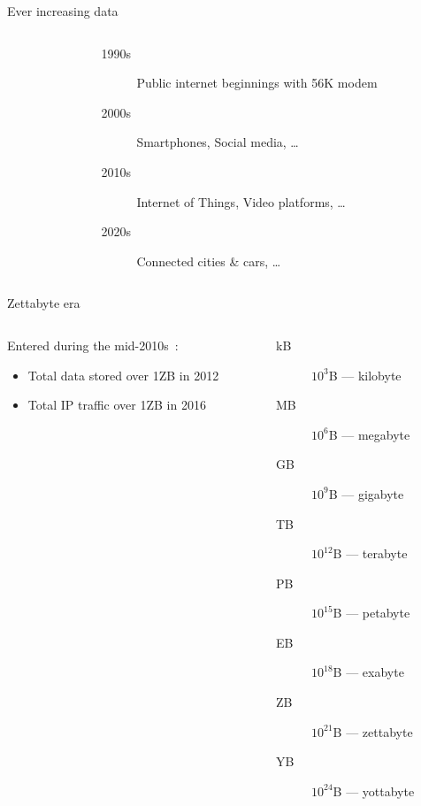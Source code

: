 \begin{frame}{Ever increasing data}
  \begin{columns}
    \begin{column}{.65\textwidth}
    \end{column}
    \begin{column}{.50\textwidth}
      \begin{description}
        \item[1990s] Public internet beginnings with 56K modem
        \item[2000s] Smartphones, Social media, …
        \item[2010s] Internet of Things, Video platforms, …
        \item[2020s] Connected cities \& cars, …
      \end{description}
    \end{column}
  \end{columns}
\end{frame}

\begin{frame}{Zettabyte era}
  \begin{columns}
    \begin{column}{.48\textwidth}
      Entered during the mid-2010s~:
      \begin{itemize}
        \item Total data stored over 1ZB in 2012
        \item Total IP traffic over 1ZB in 2016
      \end{itemize}
    \end{column}
    \begin{column}{.52\textwidth}
      \begin{description}
        \item[kB] $10^3$B — kilobyte
        \item[MB] $10^6$B — megabyte
        \item[GB] $10^9$B — gigabyte
        \item[TB] $10^{12}$B — terabyte
        \item[PB] $10^{15}$B — petabyte
        \item[EB] $10^{18}$B — exabyte
        \item[ZB] $10^{21}$B — zettabyte
        \item[YB] $10^{24}$B — yottabyte
      \end{description}
    \end{column}
  \end{columns}
\end{frame}

